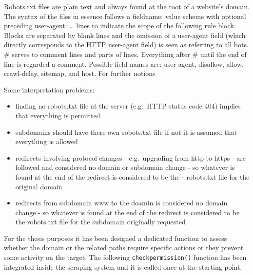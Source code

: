\documentclass[
  12pt,
  a4paper,
  oneside]{book}
\providecommand{\tightlist}{%
  \setlength{\itemsep}{0pt}\setlength{\parskip}{0pt}}
\theoremstyle{definition}
\theoremstyle{definition}
\theoremstyle{definition}
\theoremstyle{remark}
\begin{document}
Robots.txt files are plain text and always found at the root of a website's domain. The syntax of the files in essence follows a fieldname: value scheme with optional preceding user-agent: \ldots{} lines to indicate the scope of the following rule block. Blocks are separated by blank lines and the omission of a user-agent field (which directly corresponds to the HTTP user-agent field) is seen as referring to all bots. \# serves to comment lines and parts of lines. Everything after \# until the end of line is regarded a comment. Possible field names are: user-agent, disallow, allow, crawl-delay, sitemap, and host. For further notions \citep[\citet{google:robottxt}]{robotstxt}

Some interpretation problems:

\begin{itemize}
\tightlist
\item
  finding no robots.txt file at the server (e.g.~HTTP status code 404) implies that everything is permitted
\item
  subdomains should have there own robots.txt file if not it is assumed that everything is allowed
\item
  redirects involving protocol changes - e.g.~upgrading from http to https - are followed and considered no domain or subdomain change - so whatever is found at the end of the redirect is considered to be the - robots.txt file for the original domain
\item
  redirects from subdomain www to the doamin is considered no domain change - so whatever is found at the end of the redirect is considered to be the robots.txt file for the subdomain originally requested
\end{itemize}

For the thesis purposes it has been designed a dedicated function to assess whether the domain or the related paths require specific actions or they prevent some activity on the target. The following \texttt{checkpermission()} function has been integrated inside the scraping system and it is called once at the starting point.
\end{document}
